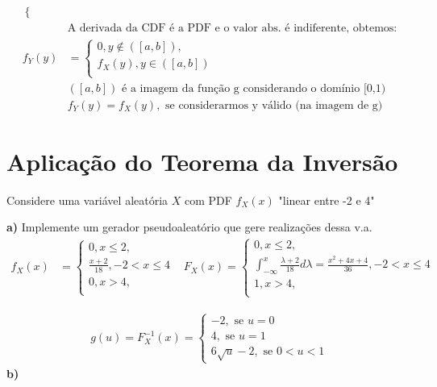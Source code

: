 \documentclass{article}
\renewcommand\bf[1]{\textbf{#1}}
\begin{document}
\begin{align*}
\begin{cases}
        \end{cases} \\
        & \text{A derivada da CDF é a PDF e o valor abs. é indiferente, obtemos:} \\
    f_Y(y) &=
        \begin{cases}
            0, y \notin ([a,b]), \\[0.5em]
            f_X(y), y \in ([a,b]) \\
        \end{cases} \\
        & ([a,b]) \text{ é a imagem da função g considerando o domínio [0,1)} \\
        & f_Y(y) = f_X(y), \text{ se considerarmos y válido (na imagem de g)}
\end{align*}

\newpage
\section{Aplicação do Teorema da Inversão}
Considere uma variável aleatória $X$ com PDF $f_X(x)$ "linear entre -2 e 4"

\bf{a)} Implemente um gerador pseudoaleatório que gere realizações dessa v.a.
\begin{align*}
    f_X(x) &=
        \begin{cases}
            0, x \leq 2, \\
            \frac{x+2}{18}, -2 < x \leq 4 \\
            0, x > 4, \\
        \end{cases}
    &F_X(x) =
        \begin{cases}
            0, x \leq 2, \\
            \int_{-\infty}^x \frac{\lambda + 2}{18} d\lambda = \frac{x^2+4x+4}{36}, -2 < x \leq 4 \\
            1, x > 4, \\
        \end{cases}
\end{align*}

\begin{align*}
    g(u) = F_X^{-1}(x) =
        \begin{cases}
            -2, \text{ se } u = 0 \\
            4, \text{ se } u = 1 \\
            6 \sqrt{u} - 2, \text{ se } 0 < u < 1
        \end{cases}
\end{align*}
\bf{b)}
\end{document}

